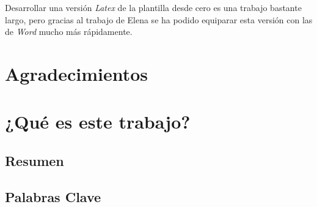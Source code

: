 \documentclass[11pt]{report}
\renewcommand{\chaptermark}[1]{\markboth{\scriptsize\MakeUppercase{#1}}{}}
\renewcommand{\sectionmark}[1]{\markright{\tiny\MakeUppercase{#1}}{}}
\renewcommand{\footrulewidth}{0.4pt}
\begin{document}
Desarrollar una versión \textit{Latex} de la plantilla desde cero es una trabajo bastante largo, pero gracias al trabajo de Elena se ha podido equiparar esta versión con las de \textit{Word} mucho más rápidamente.

\thispagestyle{empty}
\chapter*{Agradecimientos}

\pagestyle{fancy}
\renewcommand{\chaptermark}[1]{\markboth{\scriptsize\MakeUppercase{#1}}{}}
\renewcommand{\sectionmark}[1]{\markright{\tiny\MakeUppercase{#1}}{}}


\fancyfoot{}
\fancyfoot[R] {\thepage}
\renewcommand{\footrulewidth}{0.4pt}


\thispagestyle{empty}


\setcounter{tocdepth}{2}
\setcounter{secnumdepth}{4}
\pagestyle{empty}
{
  \renewcommand{\thispagestyle}[1]{}
  \tableofcontents
}
\clearpage


\newpage
{
  \renewcommand{\thispagestyle}[1]{}
  \listoffigures
}
\clearpage

\newpage
{
  \renewcommand{\thispagestyle}[1]{}
  \listoftables
}
\clearpage

\newpage
\hypersetup{pageanchor=true}

\newpage


\newpage
\thispagestyle{empty}
\chapter{¿Qué es este trabajo?}
\section{Resumen}


\section{Palabras Clave}
\end{document}
